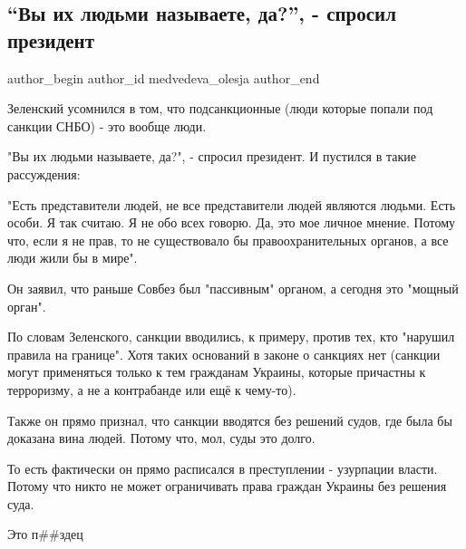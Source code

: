  
 
 
 
 
 
\subsection{\enquote{Вы их людьми называете, да?}, - спросил президент}
\label{sec:26_11_2021.fb.medvedeva_olesja.2.prezident_ludi}
 
\ifcmt
 author_begin
   author_id medvedeva_olesja
 author_end
\fi

Зеленский усомнился в том, что подсанкционные (люди которые попали под санкции
СНБО) - это вообще люди.

"Вы их людьми называете, да?", - спросил президент. И пустился в такие
рассуждения:

"Есть представители людей, не все представители людей являются людьми. Есть
особи. Я так считаю. Я не обо всех говорю. Да, это мое личное мнение. Потому
что, если я не прав, то не существовало бы правоохранительных органов, а все
люди жили бы в мире".

Он заявил, что раньше Совбез был "пассивным" органом, а сегодня это "мощный
орган".

По словам Зеленского, санкции вводились, к примеру, против тех, кто "нарушил
правила на границе". Хотя таких оснований в законе о санкциях нет (санкции
могут применяться только к тем гражданам Украины, которые причастны к
терроризму, а не а контрабанде или ещё к чему-то).

Также он прямо признал, что санкции вводятся без решений судов, где была бы
доказана вина людей. Потому что, мол, суды это долго.

То есть фактически он прямо расписался в преступлении - узурпации власти.
Потому что никто не может ограничивать права граждан Украины без решения суда.

Это п\#\#здец

